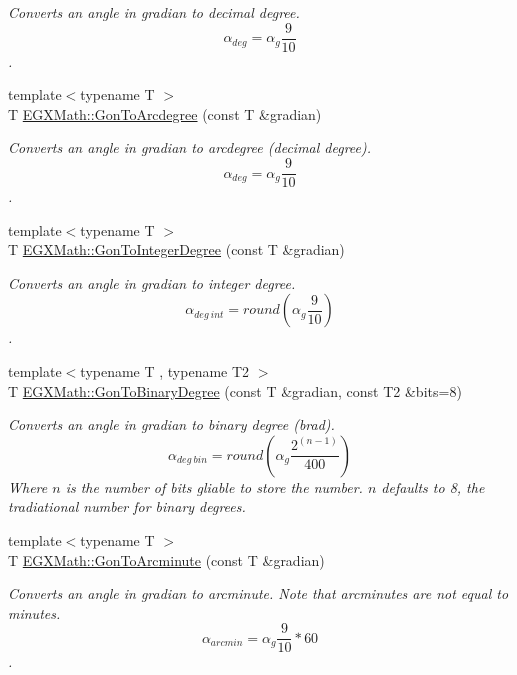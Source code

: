 \begin{DoxyCompactItemize}
\begin{DoxyCompactList}\small\item\em Converts an angle in gradian to decimal degree. \[\alpha_{deg}=\alpha_{g}\frac{9}{10}\]. \end{DoxyCompactList}\item 
{\footnotesize template$<$typename T $>$ }\\T \mbox{\hyperlink{group___e_g_x_math-_conversions-_angle_conversions-_gon_ga00757282768841abe48ac3c8452627cb}{E\+G\+X\+Math\+::\+Gon\+To\+Arcdegree}} (const T \&gradian)
\begin{DoxyCompactList}\small\item\em Converts an angle in gradian to arcdegree (decimal degree). \[\alpha_{deg}=\alpha_{g}\frac{9}{10}\]. \end{DoxyCompactList}\item 
{\footnotesize template$<$typename T $>$ }\\T \mbox{\hyperlink{group___e_g_x_math-_conversions-_angle_conversions-_gon_gaabbfaeef5b1ae1b3e58c5b4b15c8bdaf}{E\+G\+X\+Math\+::\+Gon\+To\+Integer\+Degree}} (const T \&gradian)
\begin{DoxyCompactList}\small\item\em Converts an angle in gradian to integer degree. \[\alpha_{deg\ int}=round(\alpha_{g}\frac{9}{10})\]. \end{DoxyCompactList}\item 
{\footnotesize template$<$typename T , typename T2 $>$ }\\T \mbox{\hyperlink{group___e_g_x_math-_conversions-_angle_conversions-_gon_ga4f3f154b9c553b22af2621ac3d196648}{E\+G\+X\+Math\+::\+Gon\+To\+Binary\+Degree}} (const T \&gradian, const T2 \&bits=8)
\begin{DoxyCompactList}\small\item\em Converts an angle in gradian to binary degree (brad). \[\alpha_{deg\ bin}=round(\alpha_{g}\frac{2^{(n-1)}}{400})\] Where $n$ is the number of bits gliable to store the number. $n$ defaults to 8, the tradiational number for binary degrees. \end{DoxyCompactList}\item 
{\footnotesize template$<$typename T $>$ }\\T \mbox{\hyperlink{group___e_g_x_math-_conversions-_angle_conversions-_gon_ga02679f6b0f3520ede1db642aadb51383}{E\+G\+X\+Math\+::\+Gon\+To\+Arcminute}} (const T \&gradian)
\begin{DoxyCompactList}\small\item\em Converts an angle in gradian to arcminute. Note that arcminutes are not equal to minutes. \[\alpha_{arcmin}=\alpha_{g}\frac{9}{10} * 60\]. \end{DoxyCompactList}\item 

\end{DoxyCompactItemize}
